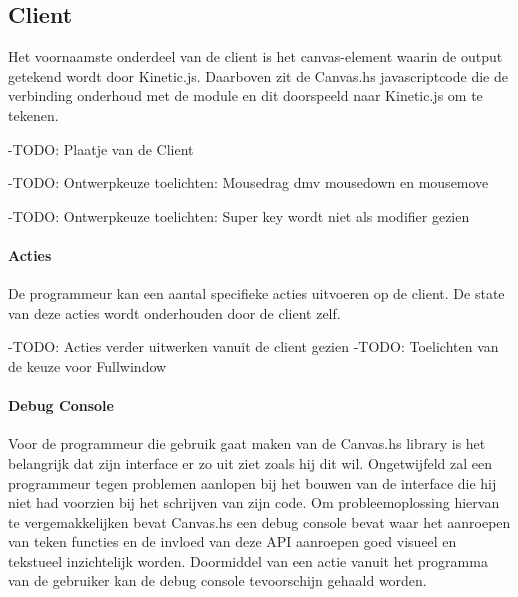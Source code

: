 
\subsection{Client}
Het voornaamste onderdeel van de client is het canvas-element waarin de output getekend wordt door Kinetic.js. Daarboven zit de Canvas.hs javascriptcode die de verbinding onderhoud met de module en dit doorspeeld naar Kinetic.js om te tekenen.

-TODO: Plaatje van de Client

-TODO: Ontwerpkeuze toelichten: Mousedrag dmv mousedown en mousemove

-TODO: Ontwerpkeuze toelichten: Super key wordt niet als modifier gezien

\paragraph{Acties}
De programmeur kan een aantal specifieke acties uitvoeren op de client. De state van deze acties wordt onderhouden door de client zelf. 

-TODO: Acties verder uitwerken vanuit de client gezien
-TODO: Toelichten van de keuze voor Fullwindow

\paragraph{Debug Console}
Voor de programmeur die gebruik gaat maken van de Canvas.hs library is het belangrijk dat zijn interface er zo uit ziet zoals hij dit wil. Ongetwijfeld zal een programmeur tegen problemen aanlopen bij het bouwen van de interface die hij niet had voorzien bij het schrijven van zijn code. Om probleemoplossing hiervan te vergemakkelijken bevat Canvas.hs een debug console bevat waar het aanroepen van teken functies en de invloed van deze API aanroepen goed visueel en tekstueel inzichtelijk worden. Doormiddel van een actie vanuit het programma van de gebruiker kan de debug console tevoorschijn gehaald worden.
